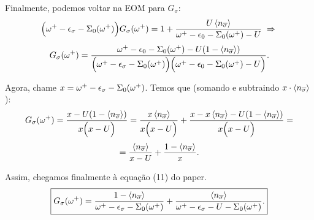 \documentclass[a4paper,fleqn,12pt]{article}
\begin{document}
Finalmente, podemos voltar na EOM para $G_\sigma$:
$$
\Big(
\omega^+ - \eps_\sigma - \Sigma_0(\omega^+)
\Big) G_\sigma(\omega^+)
= 1 + \frac{U \ev{n_{\cc{\sigma}}}}{\omega^+ - \eps_0 - \Sigma_0(\omega^+) - U}
\implies
$$
$$
G_\sigma(\omega^+) =
\frac{\omega^+ - \eps_0 - \Sigma_0(\omega^+) - U (1 - \ev{n_{\cc{\sigma}}})}
{\Big(\omega^+ - \eps_\sigma - \Sigma_0(\omega^+)\Big)\Big(\omega^+ - \eps_0 - \Sigma_0(\omega^+) - U\Big)}.
$$

Agora, chame $x = \omega^+ - \epsilon_\sigma - \Sigma_0(\omega^+)$. Temos que (somando e subtraindo $x \cdot \ev{n_{\cc{\sigma}}}$):
$$
G_\sigma(\omega^+) =
\frac{x - U (1 - \ev{n_{\cc{\sigma}}})}
{x\Big(x - U\Big)} =
\frac{x \ev{n_{\cc{\sigma}}}}{x\Big(x - U\Big)} +
\frac{x - x \ev{n_{\cc{\sigma}} } - U (1 - \ev{n_{\cc{\sigma}}})}
{x\Big(x - U\Big)} =
$$
$$
= \frac{\ev{n_{\cc{\sigma}}}}{{x - U}} + \frac{1 - \ev{n_{\cc{\sigma}}}}{x}.
$$

Assim, chegamos finalmente à equação (11) do paper.
$$
\boxed{
G_\sigma(\omega^+) =
\frac{1 - \ev{n_{\cc{\sigma}}}}{\omega^+ - \eps_\sigma - \Sigma_0(\omega^+)} +
\frac{\ev{n_{\cc{\sigma}}}}{{\omega^+ - \eps_\sigma - U - \Sigma_0(\omega^+)}}.
}
$$
\end{document}
